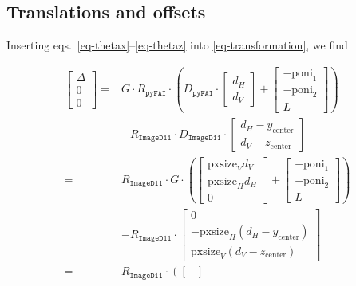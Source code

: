 \documentclass[12pt]{article}
\begin{document}
\subsection{Translations and offsets}

Inserting eqs.~\ref{eq-thetax}--\ref{eq-thetaz}
into \ref{eq-transformation}, we find

\begin{align}
  \begin{bmatrix} \Delta \\ 0 \\ 0 \end{bmatrix}
  = &
  G \cdot
  R_{\mathtt{pyFAI}}
  \cdot
  \left(
  D_{\mathtt{pyFAI}}
  \cdot
  \begin{bmatrix} d_H \\ d_V \end{bmatrix}
  +
  \begin{bmatrix} -\mathrm{poni}_1 \\ -\mathrm{poni}_2 \\ L \end{bmatrix}
  \right)
  \nonumber \\ &
  -
  R_{\mathtt{ImageD11}}
  \cdot
  D_{\mathtt{ImageD11}}
  \cdot
  \begin{bmatrix}
    d_H - y_{\mathrm{center}} \\
    d_V - z_{\mathrm{center}} 
  \end{bmatrix}
  \\
  = &
  R_{\mathtt{ImageD11}}
  \cdot
  G \cdot
  \left(
  \begin{bmatrix}
    \mathrm{pxsize}_V d_V \\ \mathrm{pxsize}_H d_H \\ 0
  \end{bmatrix}
  +
  \begin{bmatrix} -\mathrm{poni}_1 \\ -\mathrm{poni}_2 \\ L \end{bmatrix}
  \right)
  \nonumber \\ &
  -
  R_{\mathtt{ImageD11}}
  \cdot
  \begin{bmatrix}
    0 \\
    -\mathrm{pxsize}_H (d_H - y_{\mathrm{center}}) \\
    \mathrm{pxsize}_V (d_V - z_{\mathrm{center}}) 
  \end{bmatrix}
  \\
  = &
  R_{\mathtt{ImageD11}}
  \cdot
  \left(
  \begin{bmatrix}

\end{bmatrix}
\end{align}
\end{document}
